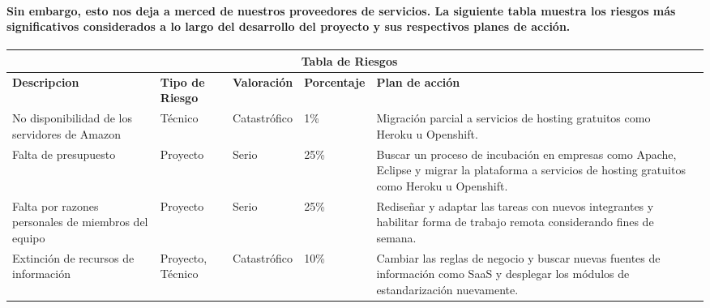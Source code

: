     \paragraph{Sin embargo, esto nos deja a merced de nuestros proveedores de servicios. La siguiente tabla muestra los riesgos más significativos considerados a lo largo del desarrollo del proyecto y sus respectivos planes de acción.}
    \newpage
    \begin{table}[b!]
    \centering
      \begin{tabular}{|p{3cm}|lllll}
        \hline
        \multicolumn{5}{|c|}{{\bf Tabla de Riesgos}} \\ 
        \hline
          \multicolumn{1}{|p{3cm}|}{{\bf Descripcion}} & 
          \multicolumn{1}{p{2cm}|}{{\bf Tipo de Riesgo}} & 
          \multicolumn{1}{p{2cm}|}{{\bf Valoración}} & 
          \multicolumn{1}{p{2cm}|}{{\bf Porcentaje}} & 
          \multicolumn{1}{p{5cm}|}{{\bf Plan de acción}} \\ 
        \hline
          \multicolumn{1}{|p{3cm}|}{No disponibilidad de los servidores de Amazon} & 
          \multicolumn{1}{p{2cm}|}{Técnico} & 
          \multicolumn{1}{p{2cm}|}{Catastrófico} & 
          \multicolumn{1}{p{2cm}|}{1\%} & 
          \multicolumn{1}{p{5cm}|}{Migración parcial a servicios de hosting gratuitos como Heroku u Openshift.} \\ 
        \hline
          \multicolumn{1}{|p{3cm}|}{Falta de presupuesto} & 
          \multicolumn{1}{p{2cm}|}{Proyecto} & 
          \multicolumn{1}{p{2cm}|}{Serio} & 
          \multicolumn{1}{p{2cm}|}{25\%} & 
          \multicolumn{1}{p{5cm}|}{Buscar un proceso de incubación en empresas como Apache, Eclipse y migrar la plataforma a servicios de hosting gratuitos como Heroku u Openshift.} \\ 
        \hline
          \multicolumn{1}{|p{3cm}|}{Falta por razones personales de miembros del equipo} & 
          \multicolumn{1}{p{2cm}|}{Proyecto} &
          \multicolumn{1}{p{2cm}|}{Serio} & 
          \multicolumn{1}{p{2cm}|}{25\%} & 
          \multicolumn{1}{p{5cm}|}{Rediseñar y adaptar las tareas con nuevos integrantes y habilitar forma de trabajo remota considerando fines de semana.} \\ 
        \hline
          \multicolumn{1}{|p{3cm}|}{Extinción de recursos de información} & 
          \multicolumn{1}{p{2cm}|}{Proyecto, Técnico} & 
          \multicolumn{1}{p{2cm}|}{Catastrófico} & 
          \multicolumn{1}{p{2cm}|}{10\%} & 
          \multicolumn{1}{p{5cm}|}{Cambiar las reglas de negocio y buscar nuevas fuentes de información como SaaS y desplegar los módulos de estandarización nuevamente.} \\ 

\end{tabular}
\end{table}
